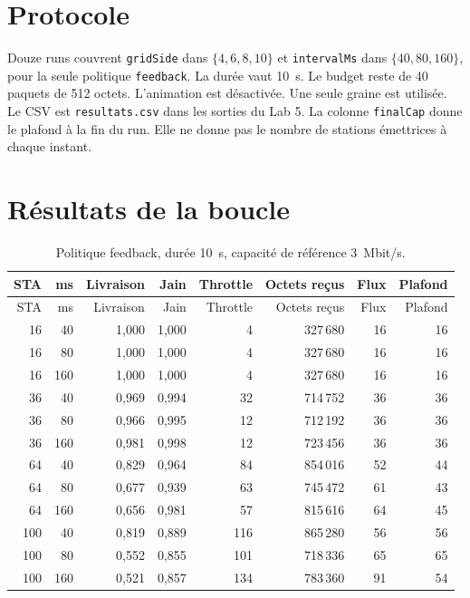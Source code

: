 \documentclass[11pt,a4paper]{article}
\begin{document}
\section{Protocole}

Douze runs couvrent \texttt{gridSide} dans $\{4, 6, 8, 10\}$ et \texttt{intervalMs} dans $\{40, 80, 160\}$, pour la seule politique \texttt{feedback}. La durée vaut 10~s. Le budget reste de 40 paquets de 512 octets. L'animation est désactivée. Une seule graine est utilisée. Le CSV est \texttt{resultats.csv} dans les sorties du Lab 5. La colonne \texttt{finalCap} donne le plafond à la fin du run. Elle ne donne pas le nombre de stations émettrices à chaque instant.

\section{Résultats de la boucle}

\begin{longtable}{@{}rrrrrrrr@{}}
\caption{Politique feedback, durée 10~s, capacité de référence 3~Mbit/s.}\\
\toprule
STA & ms & Livraison & Jain & Throttle & Octets reçus & Flux & Plafond \\
\midrule
\endfirsthead
\toprule
STA & ms & Livraison & Jain & Throttle & Octets reçus & Flux & Plafond \\
\midrule
\endhead
16 & 40 & 1,000 & 1,000 & 4 & 327\,680 & 16 & 16 \\
16 & 80 & 1,000 & 1,000 & 4 & 327\,680 & 16 & 16 \\
16 & 160 & 1,000 & 1,000 & 4 & 327\,680 & 16 & 16 \\
36 & 40 & 0,969 & 0,994 & 32 & 714\,752 & 36 & 36 \\
36 & 80 & 0,966 & 0,995 & 12 & 712\,192 & 36 & 36 \\
36 & 160 & 0,981 & 0,998 & 12 & 723\,456 & 36 & 36 \\
64 & 40 & 0,829 & 0,964 & 84 & 854\,016 & 52 & 44 \\
64 & 80 & 0,677 & 0,939 & 63 & 745\,472 & 61 & 43 \\
64 & 160 & 0,656 & 0,981 & 57 & 815\,616 & 64 & 45 \\
100 & 40 & 0,819 & 0,889 & 116 & 865\,280 & 56 & 56 \\
100 & 80 & 0,552 & 0,855 & 101 & 718\,336 & 65 & 65 \\
100 & 160 & 0,521 & 0,857 & 134 & 783\,360 & 91 & 54 \\
\bottomrule
\end{longtable}
\end{document}
